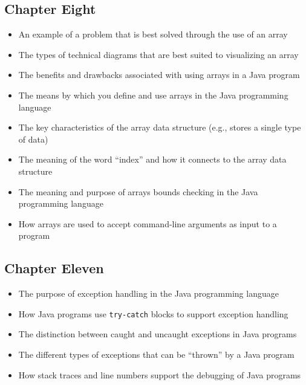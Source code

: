 \vspace*{-.15in}
\subsection*{Chapter Eight}
\vspace*{-.15in}

\begin{itemize}

  \itemsep -.015in
  \item An example of a problem that is best solved through the use of an array
  \item The types of technical diagrams that are best suited to visualizing an array
  \item The benefits and drawbacks associated with using arrays in a Java program
  \item The means by which you define and use arrays in the Java programming language
  \item The key characteristics of the array data structure (e.g., stores a single type of data)
  \item The meaning of the word ``index'' and how it connects to the array data structure
  \item The meaning and purpose of arrays bounds checking in the Java programming language
  \item How arrays are used to accept command-line arguments as input to a program

  \end{itemize}

\vspace*{-.15in}
\subsection*{Chapter Eleven}
\vspace*{-.15in}

\begin{itemize}

  \itemsep 0in
  \item The purpose of exception handling in the Java programming language
  \item How Java programs use {\tt try-catch} blocks to support exception handling
  \item The distinction between caught and uncaught exceptions in Java programs
  \item The different types of exceptions that can be ``thrown'' by a Java program
  \item How stack traces and line numbers support the debugging of Java programs

  \end{itemize}


